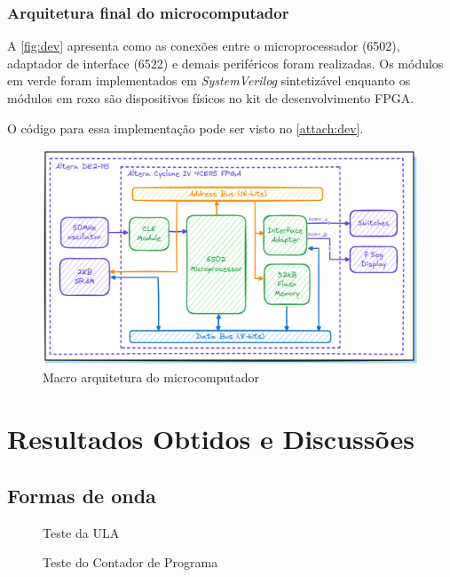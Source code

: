 \documentclass[
	12pt,				  %
	openright,		%
	a4paper,			%
	english,			%
	french,				%
	spanish,			%
	brazil,				%
]{abntex2}
\begin{document}
\subsection{Arquitetura final do microcomputador}
A \autoref{fig:dev} apresenta como as conexões entre o microprocessador (6502), adaptador de interface (6522)
e demais periféricos foram realizadas. Os módulos em verde foram implementados em \emph{SystemVerilog} sintetizável
enquanto os módulos em roxo são dispositivos físicos no kit de desenvolvimento FPGA.

O código para essa implementação pode ser visto no \autoref{attach:dev}.

\begin{figure}[h]
	\centering
	\caption{Macro arquitetura do microcomputador} \label{fig:dev}
	\includegraphics[width=\columnwidth]{../assets/img/dev.png}
\end{figure}

\chapter{Resultados Obtidos e Discussões}

\section{Formas de onda}

\begin{figure}[h]
	\centering
	\caption{Teste da ULA} \label{fig:wave:alu}
	
\end{figure}

\begin{figure}[h]
	\centering
	\caption{Teste do Contador de Programa} \label{fig:wave:pc}
	
\end{figure}
\end{document}
